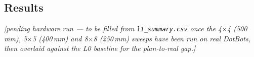 \subsection{Results}

\textit{[pending hardware run --- to be filled from \texttt{l1\_summary.csv} once the
4$\times$4 (500\,mm), 5$\times$5 (400\,mm) and 8$\times$8 (250\,mm) sweeps have been run
on real DotBots, then overlaid against the L0 baseline for the plan-to-real gap.]}
